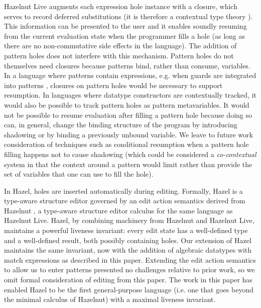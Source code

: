 Hazelnut Live augments each expression hole instance with a closure, which serves to record deferred substitutions 
(it is therefore a contextual type theory \cite{DBLP:journals/tocl/NanevskiPP08}). This information can be presented to the user and it enables soundly resuming from the current evaluation state when the programmer fills a hole (as long as there are no non-commutative side effects in the language).
The addition of pattern holes does not interfere with this mechanism. Pattern holes do not themselves need closures because patterns bind,
rather than consume, variables. In a language where patterns contain expressions, e.g. when guards are integrated into patterns \cite{Reppy2019}, closures on pattern holes would be necessary to support resumption. In languages where datatype constructors are contextually tracked, it would also be possible to track pattern holes as pattern metavariables. It would not be possible to resume evaluation after filling a pattern hole because doing so can, in general, change the binding structure of the program by introducing shadowing or by binding a previously unbound variable. We leave to future work consideration of techniques such as 
conditional resumption when a pattern hole filling happens not to cause shadowing (which could be considered a \emph{co-contextual} system in that the context around a pattern would limit rather than provide the set of variables that one can use to fill the hole).

In Hazel, holes are inserted automatically during editing. Formally, Hazel is a type-aware structure editor governed by an edit action semantics derived from Hazelnut \cite{DBLP:conf/popl/OmarVHAH17}, a type-aware structure editor calculus 
for the same language as Hazelnut Live. 
Hazel, by combining machinery from Hazelnut and Hazelnut Live, maintains a powerful liveness invariant: every edit state has a well-defined type
and a well-defined result, both possibly containing holes.
Our extension of Hazel maintains the same invariant, now with the addition of algebraic datatypes with match expressions 
as described in this paper. 
Extending the edit action semantics to allow us to enter patterns presented no challenges relative to prior work, so we omit formal consideration of editing from this paper. The work in this paper has enabled Hazel to be the first general-purpose language (i.e. one that goes beyond the minimal calculus of Hazelnut) with a maximal liveness invariant.

